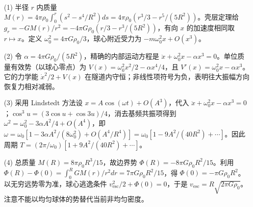 (1) 半径 \(r\) 内质量 \(M(r)=4\pi\rho_0\int_0^r(s^2-s^4/R^2)ds=4\pi\rho_0(r^3/3-r^5/(5R^2))\)。壳层定理给 \(g_r=-GM(r)/r^2=-4\pi G\rho_0(r/3-r^3/(5R^2))\)，有向 \(x\) 的加速度相同取 \(r\mapsto x\)。定义 \(\omega_0^2=4\pi G\rho_0/3\)，球心附近受力为 \(-m\omega_0^2x+O(x^3)\)。

(2) 令 \(\alpha=4\pi G\rho_0/(5R^2)\)，精确的内部运动方程是 \(\ddot x+\omega_0^2x-\alpha x^3=0\)。单位质量有效势（以球心零点）为 \(V(x)=\omega_0^2x^2/2-\alpha x^4/4\)，且 \(V'(x)=\omega_0^2x-\alpha x^3\)。它的力学能 \(\dot x^2/2+V(x)\) 在隧道内守恒；非线性项符号为负，表明往大振幅方向恢复力相对减弱。

(3) 采用 Lindstedt 方法设 \(x=A\cos(\omega t)+O(A^3)\)，代入 \(\ddot x+\omega_0^2x-\alpha x^3=0\)；\(\cos^3 u=(3\cos u+\cos3u)/4\)，消去基频共振项得到 \(\omega^2=\omega_0^2-3\alpha A^2/4+O(A^4)\)，即 \(\omega=\omega_0[1-3\alpha A^2/(8\omega_0^2)+O(A^4/R^4)]=\omega_0[1-9A^2/(40R^2)+\cdots]\)。因此周期 \(T=(2\pi/\omega_0)[1+9A^2/(40R^2)+\cdots]\)。

(4) 总质量 \(M(R)=8\pi\rho_0R^3/15\)，故边界势 \(\Phi(R)=-8\pi G\rho_0R^2/15\)。利用 \(\Phi(R)-\Phi(0)=\int_0^R GM(r)/r^2dr=7\pi G\rho_0R^2/15\)，得 \(\Phi(0)=-\pi G\rho_0R^2\)。以无穷远势零为准，球心逃逸条件 \(v_{\mathrm{esc}}^2/2+\Phi(0)=0\)，于是 \(v_{\mathrm{esc}}=R\sqrt{2\pi G\rho_0}\)。注意不能以均匀球体的势替代当前非均匀密度。
